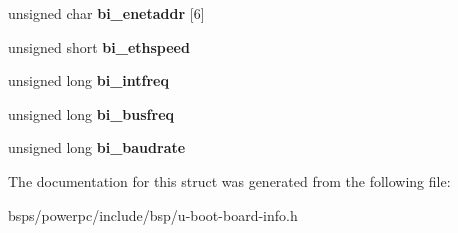 \begin{DoxyCompactItemize}
unsigned char {\bfseries bi\+\_\+enetaddr} \mbox{[}6\mbox{]}
\item 
\mbox{\label{structbd__info_ad95932b51bdff42196fc06b85ae817d1}} 
unsigned short {\bfseries bi\+\_\+ethspeed}
\item 
\mbox{\label{structbd__info_ab0d4c510c44825df251f95031c911bc4}} 
unsigned long {\bfseries bi\+\_\+intfreq}
\item 
\mbox{\label{structbd__info_a974d74cd3a2ed5d16e6e1b5ac860d5c2}} 
unsigned long {\bfseries bi\+\_\+busfreq}
\item 
\mbox{\label{structbd__info_a53637e9ace07a4f1faeb0d477703e2fb}} 
unsigned long {\bfseries bi\+\_\+baudrate}
\end{DoxyCompactItemize}


The documentation for this struct was generated from the following file\+:\begin{DoxyCompactItemize}
\item 
bsps/powerpc/include/bsp/u-\/boot-\/board-\/info.\+h\end{DoxyCompactItemize}
